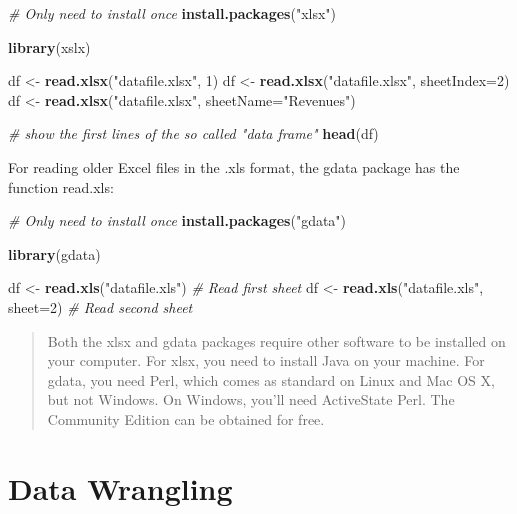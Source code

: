 \documentclass[
  a4paperpaper,
]{book}
\newenvironment{Shaded}{\begin{snugshade}}{\end{snugshade}}
\newcommand{\CommentTok}[1]{\textcolor[rgb]{0.56,0.35,0.01}{\textit{#1}}}
\newcommand{\DataTypeTok}[1]{\textcolor[rgb]{0.13,0.29,0.53}{#1}}
\newcommand{\DecValTok}[1]{\textcolor[rgb]{0.00,0.00,0.81}{#1}}
\newcommand{\KeywordTok}[1]{\textcolor[rgb]{0.13,0.29,0.53}{\textbf{#1}}}
\newcommand{\NormalTok}[1]{#1}
\newcommand{\StringTok}[1]{\textcolor[rgb]{0.31,0.60,0.02}{#1}}
\let\oldShaded\Shaded
\let\endoldShaded\endShaded
\renewenvironment{Shaded}{\footnotesize\oldShaded}{\endoldShaded}
\begin{document}
\begin{Shaded}
\begin{Highlighting}[]
\CommentTok{# Only need to install once}
\KeywordTok{install.packages}\NormalTok{(}\StringTok{"xlsx"}\NormalTok{)}

\KeywordTok{library}\NormalTok{(xslx)}

\NormalTok{df <-}\StringTok{ }\KeywordTok{read.xlsx}\NormalTok{(}\StringTok{"datafile.xlsx"}\NormalTok{, }\DecValTok{1}\NormalTok{)}
\NormalTok{df <-}\StringTok{ }\KeywordTok{read.xlsx}\NormalTok{(}\StringTok{"datafile.xlsx"}\NormalTok{, }\DataTypeTok{sheetIndex=}\DecValTok{2}\NormalTok{)}
\NormalTok{df <-}\StringTok{ }\KeywordTok{read.xlsx}\NormalTok{(}\StringTok{"datafile.xlsx"}\NormalTok{, }\DataTypeTok{sheetName=}\StringTok{"Revenues"}\NormalTok{)}

\CommentTok{# show the first lines of the so called "data frame"}
\KeywordTok{head}\NormalTok{(df)}
\end{Highlighting}
\end{Shaded}

For reading older Excel files in the .xls format, the gdata package has the function read.xls:

\begin{Shaded}
\begin{Highlighting}[]
\CommentTok{# Only need to install once}
\KeywordTok{install.packages}\NormalTok{(}\StringTok{"gdata"}\NormalTok{)}

\KeywordTok{library}\NormalTok{(gdata)}

\NormalTok{df <-}\StringTok{ }\KeywordTok{read.xls}\NormalTok{(}\StringTok{"datafile.xls"}\NormalTok{) }\CommentTok{# Read first sheet}
\NormalTok{df <-}\StringTok{ }\KeywordTok{read.xls}\NormalTok{(}\StringTok{"datafile.xls"}\NormalTok{, }\DataTypeTok{sheet=}\DecValTok{2}\NormalTok{) }\CommentTok{# Read second sheet}
\end{Highlighting}
\end{Shaded}

\begin{quote}
Both the xlsx and gdata packages require other software to be installed on your computer. For xlsx, you need to install Java on your machine. For gdata, you need Perl, which comes as standard on Linux and Mac OS X, but not Windows. On Windows, you'll need ActiveState Perl. The Community Edition can be obtained for free.
\end{quote}

\hypertarget{data-wrangling}{%
\chapter{Data Wrangling}\label{data-wrangling}}
\end{document}
